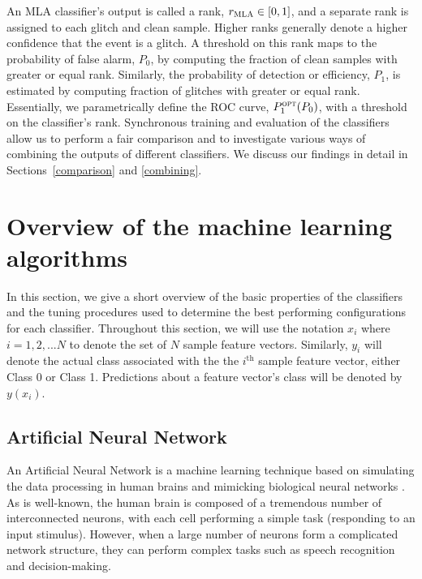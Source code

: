 \documentclass[prd, twocolumn, lengthcheck, superscriptaddress, showpacs, letterpaper, nofootinbib]{revtex4-1}
\newcommand\auxvec{x}
\newcommand\MLArank{r_{\textsc{MLA}}}
\begin{document}
An MLA classifier's output is called a rank, $\MLArank \in [0,1]$, and a separate rank is assigned to each glitch and clean sample. Higher ranks generally denote a higher confidence that the event is a glitch. A threshold on this rank maps to the probability of false alarm, $P_{0}$, by computing the fraction of clean samples with greater or equal rank. Similarly, the probability of detection or efficiency, $P_1$, is estimated by computing fraction of glitches with greater or equal rank. Essentially, we parametrically define the \ac{ROC} curve, $P_{1}^{\textsc{opt}}(P_{0})$, with a threshold on the classifier's rank. Synchronous training and evaluation of the classifiers allow us to perform a fair comparison and to investigate various ways of combining the outputs of different classifiers. We discuss our findings in detail in Sections~\ref{comparison} and \ref{combining}.
     
\section{Overview of the machine learning algorithms}
\label{pipeline}

In this section, we give a short overview of the basic properties of the classifiers and the tuning procedures used to determine the best performing configurations for each classifier. Throughout this section, we will use the notation $\auxvec_i$ where $i=1, 2, ...N$ to denote the set of $N$ sample feature vectors. Similarly, $y_i$ will denote the actual class associated with the the $i^\mathrm{th}$ sample feature vector, either Class 0 or Class 1. Predictions about a feature vector's class will be denoted by $y(\auxvec_i)$.

\subsection{Artificial Neural Network}
An Artificial Neural Network is a machine learning technique based on simulating the data processing in human brains and mimicking biological neural networks \cite{Hastie:2009,HechtNielsen:1989}. %
As is well-known, the human brain is composed of a tremendous number of interconnected neurons, with each cell performing a simple task (responding to an input stimulus). However, when a large number of neurons form a complicated network structure, they can perform complex tasks such as speech recognition and decision-making.
\end{document}
